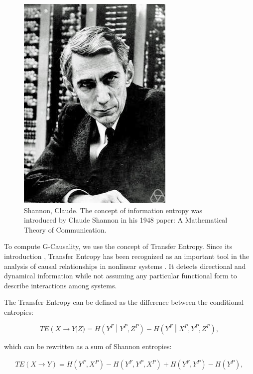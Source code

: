 \documentclass[]{book}
\theoremstyle{definition}
\theoremstyle{definition}
\theoremstyle{definition}
\theoremstyle{remark}
\begin{document}
\begin{figure}[H]

{\centering \includegraphics[width=0.5\linewidth]{./chapters/TransferEntropy/S} 

}

\caption{Shannon, Claude. The concept of information entropy was introduced by Claude Shannon in his 1948 paper: A Mathematical Theory of Communication.}\label{fig:S}
\end{figure}

To compute G-Causality, we use the concept of Transfer Entropy. Since
its introduction \citep{PhysRevLett.85.461}, Transfer Entropy has been
recognized as an important tool in the analysis of causal relationships
in nonlinear systems \citep{citeulike:1447442}. It detects directional
and dynamical information \citep{10.1371/journal.pone.0109462} while not
assuming any particular functional form to describe interactions among
systems.

The Transfer Entropy can be defined as the difference between the
conditional entropies:

\begin{equation}
 TE\left(X \rightarrow Y\right \vert Z) =  H\left(Y^F\middle\vert Y^P,Z^P\right) - H\left(Y^F\middle\vert X^P, Y^P,Z^P\right),
\label{eq:TE}
\end{equation}

which can be rewritten as a sum of Shannon entropies:

\begin{align}
TE\left(X \rightarrow Y\right) = H\left(Y^P, X^P\right) - H\left(Y^F, Y^P, X^P\right) + H\left(Y^F, Y^P\right) - H\left(Y^P\right),
\end{align}
\end{document}
